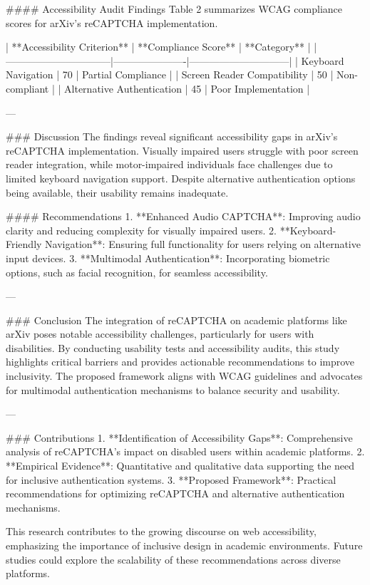 #### Accessibility Audit Findings  
Table 2 summarizes WCAG compliance scores for arXiv’s reCAPTCHA implementation.  

| **Accessibility Criterion**   | **Compliance Score** | **Category**                 |  
|--------------------------------|----------------------|------------------------------|  
| Keyboard Navigation            | 70                  | Partial Compliance           |  
| Screen Reader Compatibility    | 50                  | Non-compliant                |  
| Alternative Authentication     | 45                  | Poor Implementation          |  

---

### Discussion  
The findings reveal significant accessibility gaps in arXiv’s reCAPTCHA implementation. Visually impaired users struggle with poor screen reader integration, while motor-impaired individuals face challenges due to limited keyboard navigation support. Despite alternative authentication options being available, their usability remains inadequate.  

#### Recommendations  
1. **Enhanced Audio CAPTCHA**: Improving audio clarity and reducing complexity for visually impaired users.  
2. **Keyboard-Friendly Navigation**: Ensuring full functionality for users relying on alternative input devices.  
3. **Multimodal Authentication**: Incorporating biometric options, such as facial recognition, for seamless accessibility.  

---

### Conclusion  
The integration of reCAPTCHA on academic platforms like arXiv poses notable accessibility challenges, particularly for users with disabilities. By conducting usability tests and accessibility audits, this study highlights critical barriers and provides actionable recommendations to improve inclusivity. The proposed framework aligns with WCAG guidelines and advocates for multimodal authentication mechanisms to balance security and usability.

---

### Contributions  
1. **Identification of Accessibility Gaps**: Comprehensive analysis of reCAPTCHA’s impact on disabled users within academic platforms.  
2. **Empirical Evidence**: Quantitative and qualitative data supporting the need for inclusive authentication systems.  
3. **Proposed Framework**: Practical recommendations for optimizing reCAPTCHA and alternative authentication mechanisms.  

This research contributes to the growing discourse on web accessibility, emphasizing the importance of inclusive design in academic environments. Future studies could explore the scalability of these recommendations across diverse platforms.